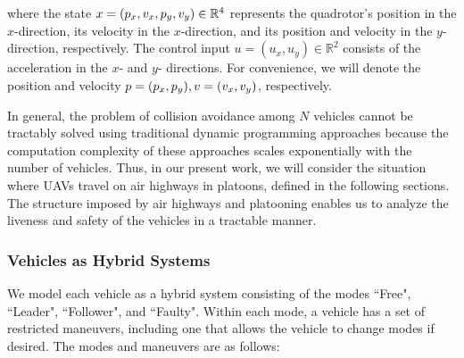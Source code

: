 \noindent where the state $x=(p_x, v_x, p_y, v_y)\in\mathbb{R}^4$ represents the quadrotor's position in the $x$-direction, its velocity in the $x$-direction, and its position and velocity in the $y$-direction, respectively. The control input $u = (u_x, u_y)\in\mathbb{R}^2$ consists of the acceleration in the $x$- and $y$- directions. For convenience, we will denote the position and velocity $p=(p_x, p_y),v=(v_x,v_y)$, respectively. 

In general, the problem of collision avoidance among $N$ vehicles cannot be tractably solved using traditional dynamic programming approaches because the computation complexity of these approaches scales exponentially with the number of vehicles. Thus, in our present work, we will consider the situation where UAVs travel on air highways in platoons, defined in the following sections. The structure imposed by air highways and platooning enables us to analyze the liveness and safety of the vehicles in a tractable manner.

\subsubsection{Vehicles as Hybrid Systems}
We model each vehicle as a hybrid system \cite{Lygeros98, Lygeros12} consisting of the modes ``Free", ``Leader", ``Follower", and ``Faulty". Within each mode, a vehicle has a set of restricted maneuvers, including one that allows the vehicle to change modes if desired. The modes and maneuvers are as follows:


